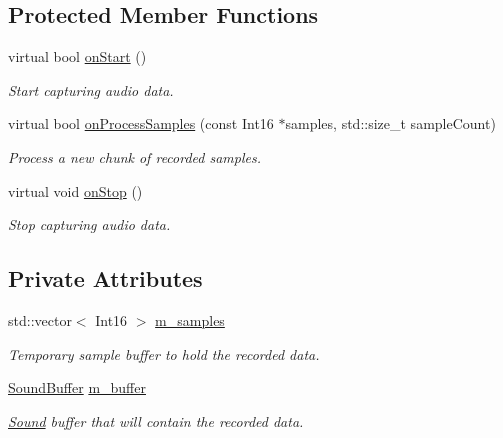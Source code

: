 \subsection*{Protected Member Functions}
\begin{DoxyCompactItemize}
\item 
virtual bool \mbox{\hyperlink{classsf_1_1_sound_buffer_recorder_a531a7445fc8a48eaf9fc039c83f17c6f}{on\+Start}} ()
\begin{DoxyCompactList}\small\item\em Start capturing audio data. \end{DoxyCompactList}\item 
virtual bool \mbox{\hyperlink{classsf_1_1_sound_buffer_recorder_a9ceb94de14632ae8c1b78faf603b4767}{on\+Process\+Samples}} (const Int16 $\ast$samples, std\+::size\+\_\+t sample\+Count)
\begin{DoxyCompactList}\small\item\em Process a new chunk of recorded samples. \end{DoxyCompactList}\item 
virtual void \mbox{\hyperlink{classsf_1_1_sound_buffer_recorder_ab8e53849312413431873a5869d509f1e}{on\+Stop}} ()
\begin{DoxyCompactList}\small\item\em Stop capturing audio data. \end{DoxyCompactList}\end{DoxyCompactItemize}
\subsection*{Private Attributes}
\begin{DoxyCompactItemize}
\item 
\mbox{\label{classsf_1_1_sound_buffer_recorder_a87080790cf294e1dc921bb90b7b352bf}} 
std\+::vector$<$ Int16 $>$ \mbox{\hyperlink{classsf_1_1_sound_buffer_recorder_a87080790cf294e1dc921bb90b7b352bf}{m\+\_\+samples}}
\begin{DoxyCompactList}\small\item\em Temporary sample buffer to hold the recorded data. \end{DoxyCompactList}\item 
\mbox{\label{classsf_1_1_sound_buffer_recorder_aacf0812e6e930cbd815073911da4626b}} 
\mbox{\hyperlink{classsf_1_1_sound_buffer}{Sound\+Buffer}} \mbox{\hyperlink{classsf_1_1_sound_buffer_recorder_aacf0812e6e930cbd815073911da4626b}{m\+\_\+buffer}}
\begin{DoxyCompactList}\small\item\em \mbox{\hyperlink{classsf_1_1_sound}{Sound}} buffer that will contain the recorded data. \end{DoxyCompactList}\end{DoxyCompactItemize}
